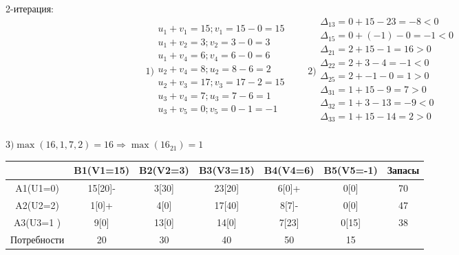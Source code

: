 \documentclass[a4paper, 12pt]{article}
\begin{document}
2-итерация:\\
\begin{equation*}
  1)\begin{split}
    u_1 + v_1 = 15; v_1 = 15-0 = 15\\
    u_1 + v_2 = 3; v_2 = 3-0 = 3\\
    u_1 + v_4 = 6; v_4 = 6-0 = 6\\
    u_2 + v_4 = 8; u_2 = 8-6 = 2\\
    u_2 + v_3 = 17; v_3 = 17-2 = 15\\
    u_3 + v_4 = 7; u_3 = 7-6 = 1\\
    u_3 + v_5 = 0; v_5 = 0-1 = -1\\
  \end{split}
  \qquad  
  2)\begin{split}
    \Delta_{13} = 0 + 15 - 23 = -8 < 0 \\
    \Delta_{15} = 0 + (-1) - 0 = -1 < 0 \\
    \Delta_{21} = 2 + 15 - 1 = 16 > 0 \\
    \Delta_{22} = 2 + 3 - 4 = -1 < 0 \\
    \Delta_{25} = 2 + -1 - 0 = 1 > 0 \\
    \Delta_{31} = 1 + 15 - 9 = 7 > 0 \\
    \Delta_{32} = 1 + 3 - 13 = -9 < 0 \\
    \Delta_{33} = 1 + 15 - 14 = 2 > 0 \\
  \end{split}
\end{equation*}

\begin{math}
  3) \max(16,1,7,2)= 16 \Rightarrow \max(16_{21}) = 1
\end{math}
\begin{table}[H]
\centering
\begin{tabular}{|c|c|c|c|c|c|c|}
\hline
            & B1(V1=15)& B2(V2=3) & B3(V3=15) & B4(V4=6)  & B5(V5=-1) & Запасы \\ \hline
A1(U1=0)    & 15[20]-  & 3[30]    & 23[20]    & 6[0]+     & 0[0]      & 70     \\ \hline
A2(U2=2)    & 1[0]+    & 4[0]     & 17[40]    & 8[7]-     & 0[0]      & 47     \\ \hline
A3(U3=1 )   & 9[0]     & 13[0]    & 14[0]     & 7[23]     & 0[15]     & 38     \\ \hline
Потребности & 20       & 30       & 40        & 50        & 15        &        \\ \hline
\end{tabular}
\end{table}
\end{document}
